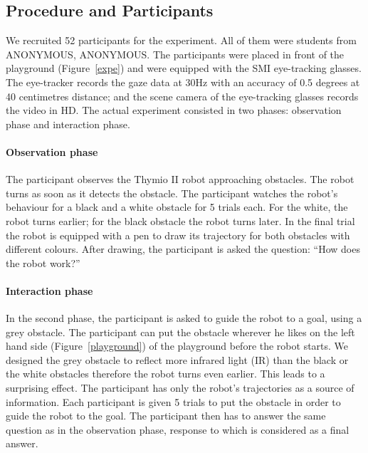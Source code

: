 \documentclass{sig-alternate}
\begin{document}
\subsection{Procedure and Participants}

We recruited 52 participants for the experiment. All of them were
students from ANONYMOUS, ANONYMOUS. The participants were placed in front of the playground (Figure~\ref{expe}) and were
equipped with the SMI eye-tracking glasses. The eye-tracker records the gaze
data at 30Hz with an accuracy of 0.5 degrees at 40 centimetres distance; and the
scene camera of the eye-tracking glasses records the video in HD.  The actual
experiment consisted in two phases: observation phase and interaction phase.

\paragraph{Observation phase} The participant observes the Thymio II robot
approaching obstacles. The robot turns as soon as it detects the
obstacle. The participant watches the robot's behaviour for a black and a
white obstacle for 5 trials each. For the white, the robot turns
earlier; for the black obstacle the robot turns later. In the final
trial the robot is equipped with a pen to draw its trajectory for both
obstacles with different colours. After drawing, the participant is asked
the question: ``How does the robot work?''

\paragraph{Interaction phase} In the second phase, the participant is asked
to guide the robot to a goal, using a grey obstacle. The participant can put the
obstacle wherever he likes on the left hand side (Figure~\ref{playground}) of
the playground before the robot starts. We designed the grey obstacle to reflect
more infrared light (IR) than the black or the white obstacles therefore the
robot turns even earlier. This leads to a surprising effect. The participant has
only the robot's trajectories as a source of information. Each participant is
given 5 trials to put the obstacle in order to guide the robot to the goal. The
participant then has to answer the same question as in the observation phase,
response to which is considered as a final answer.
\end{document}
